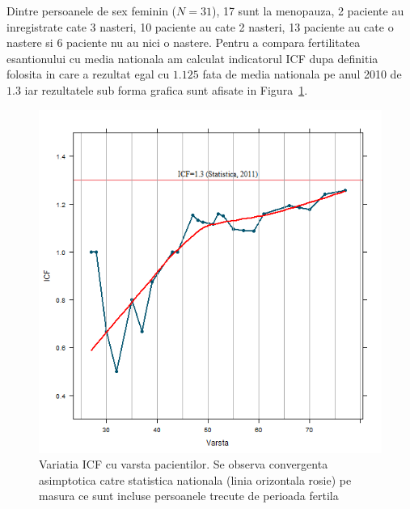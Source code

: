 \documentclass[11pt,draft]{article}
\begin{document}
  \begin{multicols}{2}
  Dintre persoanele de sex feminin ($N=31$), 17 sunt la menopauza, 2 paciente au inregistrate cate 3 nasteri, 10 paciente au cate 2 nasteri, 13 paciente au cate o nastere si 6 paciente nu au nici o nastere. Pentru a compara fertilitatea esantionului cu media nationala am calculat indicatorul \ac{ICF} dupa definitia folosita in \citep{insee2011} care a rezultat egal cu $1.125$ fata de media nationala pe anul 2010 de $1.3$ iar rezultatele sub forma grafica sunt afisate in Figura~\ref{fig:incoNasteriICF}.
  \begin{figure}[H]
    \centering
    \includegraphics[width=0.8\linewidth]{incoNasteriICF}
    \caption{Variatia ICF cu varsta pacientilor. Se observa convergenta asimptotica catre statistica nationala (linia orizontala rosie) pe masura ce sunt incluse persoanele trecute de perioada fertila }
    \label{fig:incoNasteriICF}
  \end{figure}
  

\end{multicols}
\end{document}
